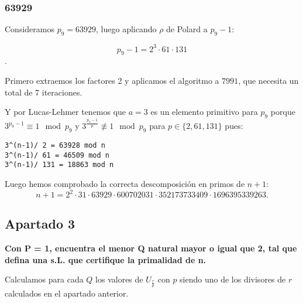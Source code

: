\documentclass[a4paper]{article}
\begin{document}
\subsubsection{63929}

Consideramos $p_9=63929$, luego aplicando $\rho$ de Polard a $p_9-1$:

$$p_9-1=2^3 \cdot 61\cdot 131$$.

Primero extraemos los factores 2 y aplicamos el algoritmo a $7991$, que necesita un total de 7 iteraciones.

Y por Lucas-Lehmer tenemos que $a=3$ es un elemento primitivo para $p_9$ porque $3^{p_9-1}\equiv 1\mod p_9$ y $3^{\frac{p_9-1}{p}}\not\equiv 1\mod p_9 $ para $p\in\{2, 61,131\}$ pues:

\begin{verbatim}
3^(n-1)/ 2 = 63928 mod n
3^(n-1)/ 61 = 46509 mod n
3^(n-1)/ 131 = 18863 mod n
\end{verbatim}


Luego hemos comprobado la correcta descomposición en primos de $n+1$:
$$n+1 = 2^2\cdot 31 \cdot 63929\cdot 600702031\cdot 352173733409\cdot 1696395339263.$$


\subsection{Apartado 3}

\textbf{Con P = 1, encuentra el menor Q natural mayor o igual que 2, tal que defina una s.L. que certifique la primalidad de n.}

Calculamos para cada $Q$ los valores de $U_{\frac{r}{p}}$ con $p$ siendo uno de los divisores de $r$ calculados en el apartado anterior.
\end{document}

